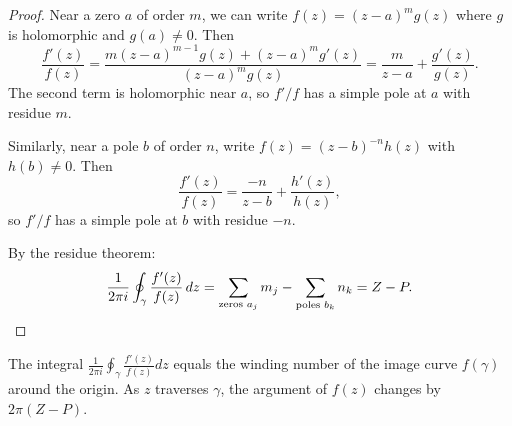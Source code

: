 \begin{proof}
  Near a zero $a$ of order $m$, we can write $f(z) = (z-a)^m g(z)$ where $g$ is holomorphic and $g(a) \neq 0$. Then
  \[
    \frac{f'(z)}{f(z)} = \frac{m(z-a)^{m-1} g(z) + (z-a)^m g'(z)}{(z-a)^m g(z)} = \frac{m}{z-a} + \frac{g'(z)}{g(z)}.
  \]
  The second term is holomorphic near $a$, so $f'/f$ has a simple pole at $a$ with residue $m$.

  Similarly, near a pole $b$ of order $n$, write $f(z) = (z-b)^{-n} h(z)$ with $h(b) \neq 0$. Then
  \[
    \frac{f'(z)}{f(z)} = \frac{-n}{z-b} + \frac{h'(z)}{h(z)},
  \]
  so $f'/f$ has a simple pole at $b$ with residue $-n$.

  By the residue theorem:
  \[
    \frac{1}{2\pi i} \oint_\gamma \frac{f'(z)}{f(z)} \, dz = \sum_{\text{zeros } a_j} m_j - \sum_{\text{poles } b_k} n_k = Z - P. \qedhere
  \]
\end{proof}

\begin{remark}
  The integral $\frac{1}{2\pi i} \oint_\gamma \frac{f'(z)}{f(z)} dz$ equals the winding number of the image curve $f(\gamma)$ around the origin. As $z$ traverses $\gamma$, the argument of $f(z)$ changes by $2\pi(Z - P)$.
\end{remark}

